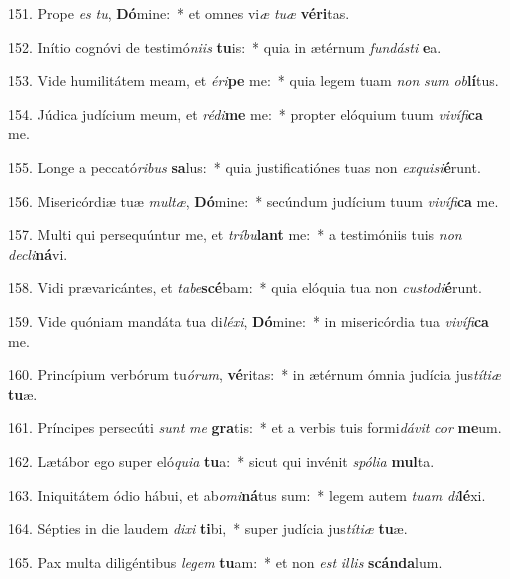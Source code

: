 151. Prope \textit{es} \textit{tu}, \textbf{Dó}mine:~*  et omnes vi\textit{æ} \textit{tu}\textit{æ} \textbf{vé}\textbf{ri}tas.\

152. Inítio cognóvi de testimó\textit{ni}\textit{is} \textbf{tu}is:~*  quia in ætérnum \textit{fun}\textit{dás}\textit{ti} \textbf{e}a.\

153. Vide humilitátem meam, et \textit{é}\textit{ri}\textbf{pe} me:~*  quia legem tuam \textit{non} \textit{sum} \textit{ob}\textbf{lí}tus.\

154. Júdica judícium meum, et \textit{réd}\textit{i}\textbf{me} me:~*  propter elóquium tuum \textit{vi}\textit{ví}\textit{fi}\textbf{ca} me.\

155. Longe a peccató\textit{ri}\textit{bus} \textbf{sa}lus:~*  quia justificatiónes tuas non \textit{ex}\textit{qui}\textit{si}\textbf{é}runt.\

156. Misericórdiæ tuæ \textit{mul}\textit{tæ}, \textbf{Dó}mine:~*  secúndum judícium tuum \textit{vi}\textit{ví}\textit{fi}\textbf{ca} me.\

157. Multi qui persequúntur me, et \textit{trí}\textit{bu}\textbf{lant} me:~*  a testimóniis tuis \textit{non} \textit{de}\textit{cli}\textbf{ná}vi.\

158. Vidi prævaricántes, et \textit{ta}\textit{be}\textbf{scé}bam:~*  quia elóquia tua non \textit{cus}\textit{to}\textit{di}\textbf{é}runt.\

159. Vide quóniam mandáta tua di\textit{lé}\textit{xi}, \textbf{Dó}mine:~*  in misericórdia tua \textit{vi}\textit{ví}\textit{fi}\textbf{ca} me.\

160. Princípium verbórum tu\textit{ó}\textit{rum}, \textbf{vé}ritas:~*  in ætérnum ómnia judícia jus\textit{tí}\textit{ti}\textit{æ} \textbf{tu}æ.\

161. Príncipes persecúti \textit{sunt} \textit{me} \textbf{gra}tis:~*  et a verbis tuis formi\textit{dá}\textit{vit} \textit{cor} \textbf{me}um.\

162. Lætábor ego super eló\textit{qui}\textit{a} \textbf{tu}a:~*  sicut qui invénit \textit{spó}\textit{li}\textit{a} \textbf{mul}ta.\

163. Iniquitátem ódio hábui, et ab\textit{o}\textit{mi}\textbf{ná}tus sum:~*  legem autem \textit{tu}\textit{am} \textit{di}\textbf{lé}xi.\

164. Sépties in die laudem \textit{di}\textit{xi} \textbf{ti}bi,~*  super judícia jus\textit{tí}\textit{ti}\textit{æ} \textbf{tu}æ.\

165. Pax multa diligéntibus \textit{le}\textit{gem} \textbf{tu}am:~*  et non \textit{est} \textit{il}\textit{lis} \textbf{scán}\textbf{da}lum.\

